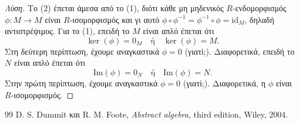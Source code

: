 \documentclass[12pt,a4paper,reqno]{amsart}
\theoremstyle{definition}
\renewcommand{\to}{\rightarrow}
\newcommand{\rmIm}{\mathrm{Im}}
\newcommand{\rmid}{\mathrm{id}}
\begin{document}
\begin{proof}[Λύση]
  Το (2) έπεται άμεσα από το (1), διότι κάθε μη μηδενικός $R$-ενδομορφισμός $\phi : M \to M$ είναι $R$-ισομορφισμός και γι αυτό $\phi \circ \phi^{-1} = \phi^{-1}\circ \phi = \rmid_M$, δηλαδή αντιστρέψιμος. Για το (1), επειδή το $M$ είναι απλό έπεται ότι 
  \[
  \ker(\phi) = 0_M \quad \text{ή} \quad \ker(\phi) = M.
  \]
  Στη δεύτερη περίπτωση, έχουμε αναγκαστικά $\phi = 0$ (γιατί;). Διαφορετικά, επειδή το $N$ είναι απλό έπεται ότι 
  \[
  \rmIm(\phi) = 0_N \quad \text{ή} \quad \rmIm(\phi) = N.
  \]
  Στην πρώτη περίπτωση, έχουμε αναγκαστικά $\phi = 0$ (γιατί;). Διαφορετικά, η $\phi$ είναι $R$-ισομορφισμός.
\end{proof}
 
\begin{thebibliography}{99}
    D. S. Dummit και R. M. Foote, 
    \textit{Abstract algebra},
    third edition, Wiley, 2004. 
\end{thebibliography}
\end{document}
